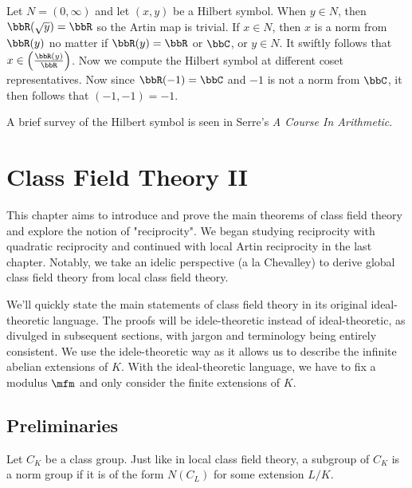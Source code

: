 \documentclass[a4paper, 12pt,oneside,openany]{book}
\begin{document}
Let $N = (0, \infty)$ and let $(x, y)$ be a Hilbert symbol. When $y \in N$, then $\bbR(\sqrt{y})=\bbR$ so the Artin map is trivial. If $x \in N$, then $x$ is a norm from $\bbR(y)$ no matter if $\bbR(y) = \bbR$ or $\bbC$, or $y \in N$. It swiftly follows that $x \in \left(\frac{\bbR(y)}{\bbR}\right)$. Now we compute the Hilbert symbol at different coset representatives. Now since $\bbR(-1)=\bbC$ and $-1$ is not a norm from $\bbC$, it then follows that $(-1, -1)=-1$.

A brief survey of the Hilbert symbol is seen in Serre's \emph{A Course In Arithmetic}. 

\chapter{Class Field Theory II}
\minitoc


This chapter aims to introduce and prove the main theorems of class field theory and explore the notion of "reciprocity". We began studying reciprocity with quadratic reciprocity and continued with local Artin reciprocity in the last chapter. Notably, we take an idelic perspective (a la Chevalley) to derive global class field theory from local class field theory. 

We'll quickly state the main statements of class field theory in its original ideal-theoretic language. The proofs will be idele-theoretic instead of ideal-theoretic, as divulged in subsequent sections, with jargon and terminology being entirely consistent. We use the idele-theoretic way as it allows us to describe the infinite abelian extensions of $K$. With the ideal-theoretic language, we have to fix a modulus $\mfm$ and only consider the finite extensions of $K$.

\section{Preliminaries}

Let $C_K$ be a class group. Just like in local class field theory, a subgroup of $C_K$ is a norm group if it is of the form $N(C_L)$ for some extension $L/K$.

\end{document}
